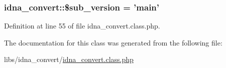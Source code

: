 \hypertarget{classidna__convert_a14d96b4efeba28496661be46a6f14a5c}{
\subsubsection[{\$sub\-\_\-version}]{\setlength{\rightskip}{0pt plus 5cm}idna\-\_\-convert\-::\$sub\-\_\-version = 'main'\hspace{0.3cm}{\ttfamily [protected]}}}\label{classidna__convert_a14d96b4efeba28496661be46a6f14a5c}


Definition at line 55 of file idna\-\_\-convert.\-class.\-php.



The documentation for this class was generated from the following file\-:\begin{DoxyCompactItemize}
\item 
libs/idna\-\_\-convert/\hyperlink{idna__convert_8class_8php}{idna\-\_\-convert.\-class.\-php}\end{DoxyCompactItemize}
